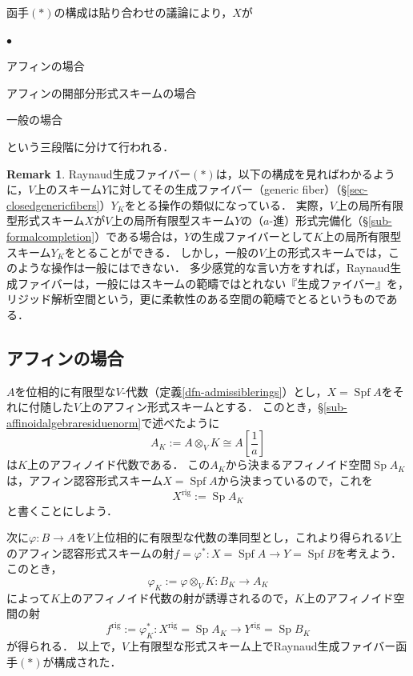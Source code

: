 \documentclass[a4paper,12pt, dvipdfmx]{jsbook}
\def\rig{\mathop{\mathrm{rig}}\nolimits}
\def\Spf{\mathop{\mathrm{Spf}}\nolimits}
\def\Sp{\mathop{\mathrm{Sp}}\nolimits}
\renewenvironment{itemize}%
{%
   \begin{list}{\parbox{1zw}{$\bullet$}}%
   {%
      \setlength{\topsep}{.5zh}
      \setlength{\itemindent}{0zw}
      \setlength{\leftmargin}{3zw}%
      \setlength{\rightmargin}{0zw}%
      \setlength{\labelsep}{.5zw}%
      \setlength{\labelwidth}{3zw}%
      \setlength{\itemsep}{0.2em}%
      \setlength{\parsep}{0em}%
      \setlength{\listparindent}{0zw}%
   }
}{%
   \end{list}%
}
\theoremstyle{plain}
\theoremstyle{definition}
\newtheorem{rem}[thm]{\bfseries Remark}
\begin{document}
函手$(\ast)$の構成は貼り合わせの議論により，$X$が
\begin{itemize}
\item[(a)] アフィンの場合
\item[(b)] アフィンの開部分形式スキームの場合
\item[(c)] 一般の場合
\end{itemize}
という三段階に分けて行われる．

\begin{rem}\label{rem-Raynaudgenericfiber}{\rm 
Raynaud生成ファイバー$(\ast)$は，以下の構成を見ればわかるように，$V$上のスキーム$Y$に対してその生成ファイバー（generic fiber）（\S\ref{sec-closedgenericfibers}）$Y_K$をとる操作の類似になっている．
実際，$V$上の局所有限型形式スキーム$X$が$V$上の局所有限型スキーム$Y$の（$a$-進）形式完備化（\S\ref{sub-formalcompletion}）である場合は，$Y$の生成ファイバーとして$K$上の局所有限型スキーム$Y_K$をとることができる．
しかし，一般の$V$上の形式スキームでは，このような操作は一般にはできない．
多少感覚的な言い方をすれば，Raynaud生成ファイバーは，一般にはスキームの範疇ではとれない『生成ファイバー』を，リジッド解析空間という，更に柔軟性のある空間の範疇でとるというものである．}
\end{rem}

\subsection{アフィンの場合}\label{sub-affinecase}
$A$を位相的に有限型な$V$-代数（定義\ref{dfn-admissiblerings}）とし，$X=\Spf A$をそれに付随した$V$上のアフィン形式スキームとする．
このとき，\S\ref{sub-affinoidalgebraresiduenorm}で述べたように
$$
{\textstyle A_K:=A\otimes_VK\cong A[\frac{1}{a}]}
$$
は$K$上のアフィノイド代数である．
この$A_K$から決まるアフィノイド空間$\Sp A_K$は，アフィン認容形式スキーム$X=\Spf A$から決まっているので，これを
$$
X^{\rig}:=\Sp A_K
$$
と書くことにしよう．

次に$\varphi\colon B\rightarrow A$を$V$上位相的に有限型な代数の準同型とし，これより得られる$V$上のアフィン認容形式スキームの射$f=\varphi^{\ast}\colon X=\Spf A\rightarrow Y=\Spf B$を考えよう．
このとき，
$$
\varphi_K:=\varphi\otimes_VK\colon B_K\longrightarrow A_K
$$
によって$K$上のアフィノイド代数の射が誘導されるので，$K$上のアフィノイド空間の射
$$
f^{\rig}:=\varphi^{\ast}_K\colon X^{\rig}=\Sp A_K\longrightarrow Y^{\rig}=\Sp B_K
$$
が得られる．
以上で，$V$上有限型な形式スキーム上でRaynaud生成ファイバー函手$(\ast)$が構成された．
\end{document}
